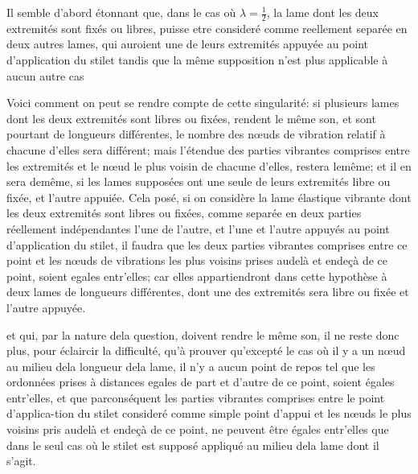 \documentclass[11pt,a4paper]{article}
\begin{document}
Il semble d'abord étonnant que, dans le cas où $\lambda = \frac{1}{2}$, la lame dont les deux
extremités sont fixés ou libres, puisse etre consideré comme reellement separée
en deux autres lames, qui auroient une de leurs extremités appuyée au point
d'application du stilet tandis que la même supposition n'est plus applicable à aucun autre
cas

Voici comment on peut se rendre compte de cette singularité: si plusieurs lames
dont les deux extremités sont libres ou fixées, rendent le même son, et sont pourtant
de longueurs différentes, le nombre des nœuds de vibration relatif à chacune d'elles
sera différent; mais l'étendue des parties vibrantes comprises entre les extremités et le nœud
le plus voisin de chacune d'elles, restera lemême; et il en sera demême, si les lames
supposées ont une seule de leurs extremités libre ou fixée, et l'autre appuiée.
Cela posé, si on considère la lame élastique vibrante dont les deux extremités
sont libres ou fixées, comme separée en deux parties réellement indépendantes l'une
de l'autre, et l'une et l'autre appuyés au point d'application du stilet, 
il faudra que les deux parties vibrantes comprises entre ce point et les nœuds de
vibrations les plus voisins prises audelà et endeçà de ce point, soient egales
entr'elles; car elles appartiendront dans cette hypothèse à deux lames de
longueurs différentes, dont une des extremités sera libre ou fixée et l'autre appuyée.


et qui, par la nature dela question, doivent rendre le même son, il ne reste
donc plus, pour éclaircir la difficulté, qu'à prouver qu'excepté le cas où il y a
un nœud au milieu dela longueur dela lame, il n'y a aucun point de repos tel
que les ordonnées prises à distances egales de part et d'autre de ce point, soient égales
entr'elles, et que parconséquent les parties vibrantes comprises entre le point d'applica-tion
du stilet consideré comme simple point d'appui et les nœuds le plus voisins
pris audelà et endeçà de ce point, ne peuvent être égales entr'elles que dans le
seul cas où le stilet est supposé appliqué au milieu dela lame dont il s'agit.
\end{document}
